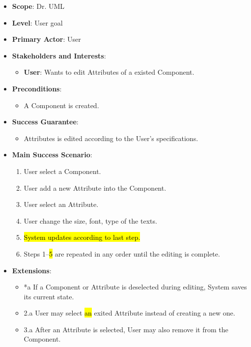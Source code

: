 \documentclass[12pt]{article}
\begin{document}
    \begin{itemize}
        \item \textbf{Scope}: Dr. UML
        \item \textbf{Level}: User goal
        \item \textbf{Primary Actor}: User
        \item \textbf{Stakeholders and Interests}:
        \begin{itemize}
            \item \textbf{User}: Wants to edit Attributes of a existed Component.
        \end{itemize}
        \item \textbf{Preconditions}:
        \begin{itemize}
            \item A Component is created.
        \end{itemize}
        \item \textbf{Success Guarantee}:
        \begin{itemize}
            \item Attributes is edited according to the User’s specifications.
        \end{itemize}
        \item \textbf{Main Success Scenario}:
        \begin{enumerate}
            \item User select a Component.
            \item User add a new Attribute into the Component.
            \item User select an Attribute.
            \item User change the size, font, type of the texts.
            \item \hl{System updates according to last step.}
            \item Steps 1--\hl{5} are repeated in any order until the editing is complete.
        \end{enumerate}
        \item \textbf{Extensions}:
        \begin{itemize}
            \item *a If a Component or Attribute is deselected during editing, System saves its current state.
            \item 2.a User may select \hl{an} exited Attribute instead of creating a new one.
            \item 3.a After an Attribute is selected, User may also remove it from the Component.

\end{itemize}
\end{itemize}
\end{document}
